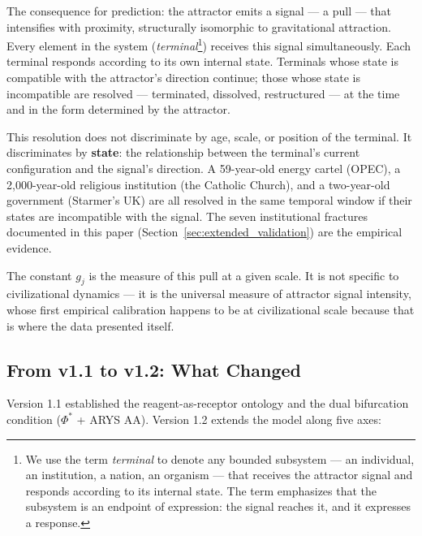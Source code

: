 \documentclass[12pt,a4paper]{article}
\newcommand{\gj}{g_j}
\newcommand{\Phistar}{\Phi^{*}}
\begin{document}
The consequence for prediction: the attractor emits a signal --- a pull --- that intensifies with proximity, structurally isomorphic to gravitational attraction. Every element in the system (\emph{terminal}\footnote{We use the term \emph{terminal} to denote any bounded subsystem --- an individual, an institution, a nation, an organism --- that receives the attractor signal and responds according to its internal state. The term emphasizes that the subsystem is an endpoint of expression: the signal reaches it, and it expresses a response.}) receives this signal simultaneously. Each terminal responds according to its own internal state. Terminals whose state is compatible with the attractor's direction continue; those whose state is incompatible are resolved --- terminated, dissolved, restructured --- at the time and in the form determined by the attractor.

This resolution does not discriminate by age, scale, or position of the terminal. It discriminates by \textbf{state}: the relationship between the terminal's current configuration and the signal's direction. A 59-year-old energy cartel (OPEC), a 2,000-year-old religious institution (the Catholic Church), and a two-year-old government (Starmer's UK) are all resolved in the same temporal window if their states are incompatible with the signal. The seven institutional fractures documented in this paper (Section~\ref{sec:extended_validation}) are the empirical evidence.

The constant $\gj$ is the measure of this pull at a given scale. It is not specific to civilizational dynamics --- it is the universal measure of attractor signal intensity, whose first empirical calibration happens to be at civilizational scale because that is where the data presented itself.

\subsection{From v1.1 to v1.2: What Changed}

Version 1.1 established the reagent-as-receptor ontology and the dual bifurcation condition ($\Phistar$ + ARYS AA). Version 1.2 extends the model along five axes:
\end{document}
